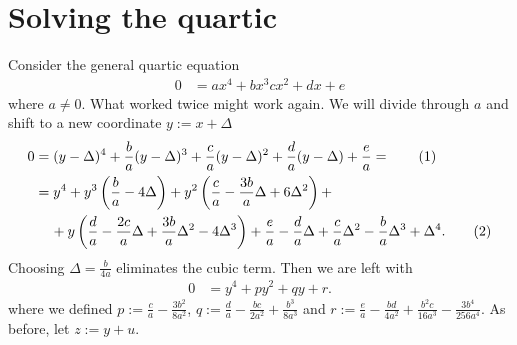 \documentclass[english, parskip=full]{scrartcl}
\newcommand\numberthis{\addtocounter{equation}{1}\tag{\theequation}}
\newcommand{\kla}{}
\begin{document}
\section{Solving the quartic}
Consider the general quartic equation
\begin{align}
0 &= ax^4+bx^3cx^2+dx+e
\end{align}
where $a\neq 0$.
What worked twice might work again. 
We will divide through $a$ and shift to a new coordinate $y := x + \Delta$
\begin{align*}
0 &= (y-\Delta)^4 + \frac{b}{a} (y-\Delta)^3 + \frac{c}{a} (y-\Delta)^2 + \frac{d}{a} (y-\Delta) + \frac{e}{a} = \numberthis \\
&= y^4 + y^3\kla\left( \frac{b}{a} - 4\Delta \right) + y^2\kla\left( \frac{c}{a} - \frac{3b}{a}\Delta + 6\Delta^2 \right) + \\
&\hspace{0.4cm} + y\kla\left( \frac{d}{a} - \frac{2c}{a}\Delta + \frac{3b}{a}\Delta^2 - 4\Delta^3 \right) + \frac{e}{a} - \frac{d}{a}\Delta + \frac{c}{a} \Delta^2 - \frac{b}{a} \Delta^3 + \Delta^4. \numberthis 
\end{align*}
Choosing $\Delta = \frac{b}{4a}$ eliminates the cubic term.
Then we are left with
\begin{align}
0 &= y^4 + py^2 + qy + r.
\end{align}
where we defined $p := \frac{c}{a} - \frac{3b^2}{8a^2}$, $q := \frac{d}{a} - \frac{bc}{2a^2} + \frac{b^3}{8a^3}$ and $r := \frac{e}{a} - \frac{bd}{4a^2} + \frac{b^2c}{16a^3} - \frac{3b^4}{256a^4}$.
As before, let $z := y + u$.
\end{document}
